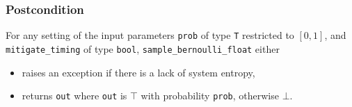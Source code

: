 \documentclass{article}
\begin{document}
 
 
\subsubsection*{Postcondition} 
 
\begin{definition} 
    \label{sample-bernoulli} 
    For any setting of the input parameters 
    \texttt{prob} of type \texttt{T} restricted to $[0, 1]$, 
    and \texttt{mitigate\_timing} of type \texttt{bool}, 
    \texttt{sample\_bernoulli\_float} either 
    \begin{itemize} 
        \item raises an exception if there is a lack of system entropy, 
        \item returns \texttt{out} where \texttt{out} is $\top$ with probability \texttt{prob}, otherwise $\bot$. 
    \end{itemize} 
\end{definition} 
 
\end{document}
